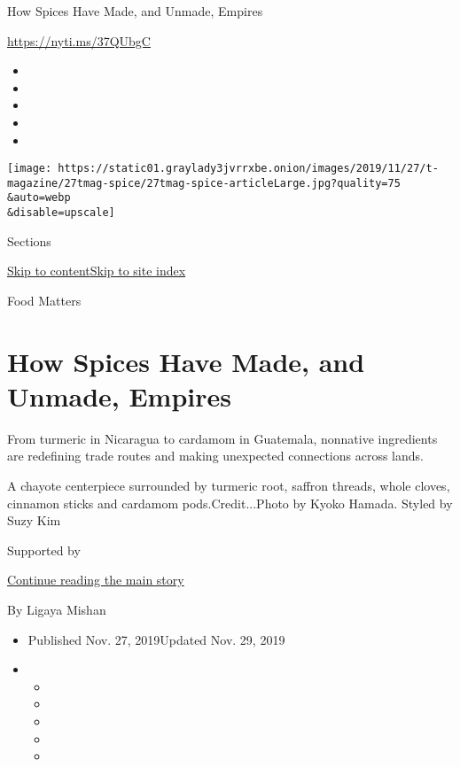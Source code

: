 How Spices Have Made, and Unmade, Empires

\url{https://nyti.ms/37QUbgC}

\begin{itemize}
\item
\item
\item
\item
\item
\end{itemize}

\texttt{[image: https://static01.graylady3jvrrxbe.onion/images/2019/11/27/t-magazine/27tmag-spice/27tmag-spice-articleLarge.jpg?quality=75\\\&auto=webp\\\&disable=upscale]}

Sections

\protect\hyperlink{site-content}{Skip to
content}\protect\hyperlink{site-index}{Skip to site index}

Food Matters

\hypertarget{how-spices-have-made-and-unmade-empires}{%
\section{How Spices Have Made, and Unmade,
Empires}\label{how-spices-have-made-and-unmade-empires}}

From turmeric in Nicaragua to cardamom in Guatemala, nonnative
ingredients are redefining trade routes and making unexpected
connections across lands.

A chayote centerpiece surrounded by turmeric root, saffron threads,
whole cloves, cinnamon sticks and cardamom pods.Credit...Photo by Kyoko
Hamada. Styled by Suzy Kim

Supported by

\protect\hyperlink{after-sponsor}{Continue reading the main story}

By Ligaya Mishan

\begin{itemize}
\item
  Published Nov. 27, 2019Updated Nov. 29, 2019
\item
  \begin{itemize}
  \item
  \item
  \item
  \item
  \item
  \end{itemize}
\end{itemize}


